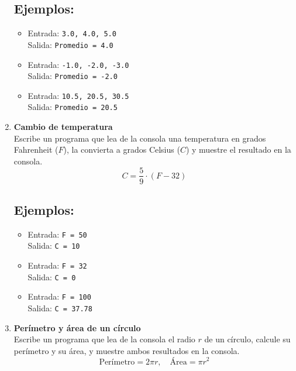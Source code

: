 \begin{enumerate}
    \subsection*{Ejemplos:}
    \begin{itemize}
        \item Entrada: \texttt{3.0, 4.0, 5.0}\\
              Salida: \texttt{Promedio = 4.0}
        \item Entrada: \texttt{-1.0, -2.0, -3.0}\\
              Salida: \texttt{Promedio = -2.0}
        \item Entrada: \texttt{10.5, 20.5, 30.5}\\
              Salida: \texttt{Promedio = 20.5}
    \end{itemize}

    \item \textbf{Cambio de temperatura}\\
    Escribe un programa que lea de la consola una temperatura en grados Fahrenheit (\(F\)), la convierta a grados Celsius (\(C\)) y muestre el resultado en la consola.\\ 
    \[
    C = \frac{5}{9} \cdot (F - 32)
    \]
    \subsection*{Ejemplos:}
    \begin{itemize}
        \item Entrada: \texttt{F = 50}\\
              Salida: \texttt{C = 10}
        \item Entrada: \texttt{F = 32}\\
              Salida: \texttt{C = 0}
        \item Entrada: \texttt{F = 100}\\
              Salida: \texttt{C = 37.78}
    \end{itemize}

    \item \textbf{Perímetro y área de un círculo}\\
    Escribe un programa que lea de la consola el radio \(r\) de un círculo, calcule su perímetro y su área, y muestre ambos resultados en la consola.\\   
    \[
    \text{Perímetro} = 2\pi r, \quad \text{Área} = \pi r^2
    \]

\end{enumerate}
